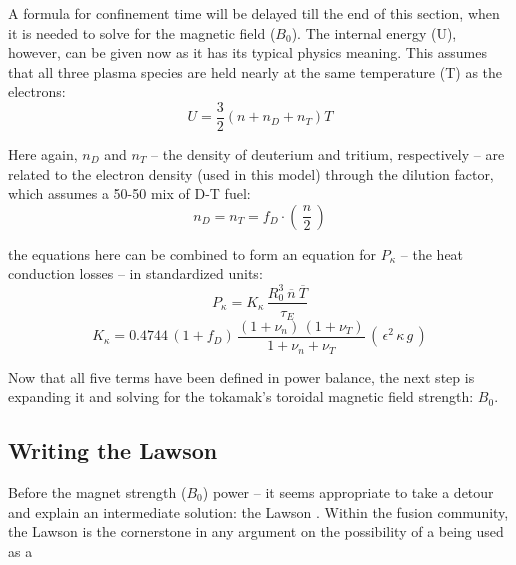 A formula for confinement time will be delayed till the end of this section, when it is needed to solve for the magnetic field ($B_0$). The internal energy (U), however, can be given now as it has its typical physics meaning. This assumes that all three plasma species are held nearly at the same temperature (T) as the electrons:
\begin{equation}
	U = \frac{3}{2} \left( n + n_D + n_T \right) T
\end{equation}

Here again, $n_D$ and $n_T$ -- the density of deuterium and tritium, respectively -- are related to the electron density (used in this model) through the dilution factor, which assumes a 50-50 mix of D-T fuel:
\begin{equation}
	n_D = n_T = f_D \cdot \left( \, \frac{n}{2} \, \right)
\end{equation}

 the equations here can be combined to form an equation for $P_\kappa$ -- the heat conduction losses -- in standardized units:
\begin{equation}
	\label{eq:pkappa}
	P_\kappa = K_\kappa \, \frac{ R_0 ^ 3 \ \overline{n}  \ \overline{T}  }{\tau_E} 
\end{equation}
\begin{equation}
	K_\kappa = 0.4744 \, ( 1 + f_D ) \, \frac{ (1 + \nu_n) \, (1 + \nu_T) }{1 + \nu_n + \nu_T } \, ( \, \epsilon^2 \, \kappa \, g \, )
\end{equation}

Now that all five terms have been defined in power balance, the next step is expanding it and solving for the tokamak's toroidal magnetic field strength: $B_0$.

\subsection{Writing the Lawson }

Before  the magnet strength ($B_0$)  power  -- it seems appropriate to take a detour and explain an intermediate solution: the Lawson .\cite{lawson} Within the fusion community, the Lawson  is the cornerstone in any argument on the possibility of a  being used as a 


